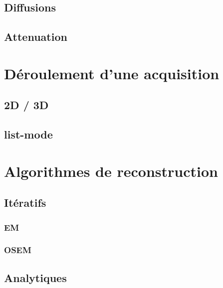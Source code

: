 	\section{Diffusions}

	\section{Attenuation}

\chapter{Déroulement d'une acquisition}
	\section{2D / 3D}
	\section{list-mode}

\chapter{Algorithmes de reconstruction}
	\section{Itératifs}
		\subsection{EM}
		\subsection{OSEM}
	\section{Analytiques}
